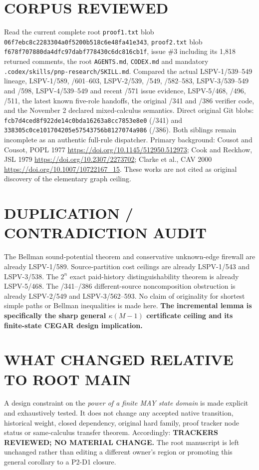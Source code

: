 \documentclass[11pt]{article}
\begin{document}
\section*{CORPUS REVIEWED}
Read the current complete root \texttt{proof1.txt} blob
\texttt{06f7ebc8c2283304a0f5200b518c6e48fa41e343},
\texttt{proof2.txt} blob \texttt{f678f707880da4dfc97dabf778430c6dc816cb1f},
issue \#3 including its 1,818 returned comments, the root \texttt{AGENTS.md},
\texttt{CODEX.md} and mandatory \texttt{.codex/skills/pnp-research/SKILL.md}.
Compared the actual LSPV-1/539--549 lineage, LSPV-1/589, /601--603,
LSPV-2/539, /549, /582--583, LSPV-3/539--549 and /598,
LSPV-4/539--549 and recent /571 issue evidence,
LSPV-5/468, /496, /511, the latest known five-role handoffs,
the original /341 and /386 verifier code, and the November 2 declared
mixed-calculus semantics. Direct original Git blobs:
\texttt{fcb7d4ced8f922de14c0bda16263a8cc7853e8e0} (/341) and
\texttt{338305c0ce101704205e57543756b8127074a986} (/386).
Both siblings remain incomplete as an authentic full-rule dispatcher.
Primary background: Cousot and Cousot, POPL 1977
\url{https://doi.org/10.1145/512950.512973};
Cook and Reckhow, JSL 1979
\url{https://doi.org/10.2307/2273702};
Clarke et al., CAV 2000
\url{https://doi.org/10.1007/10722167_15}.
These works are not cited as original discovery of the elementary graph ceiling.

\section*{DUPLICATION / CONTRADICTION AUDIT}
The Bellman sound-potential theorem and conservative unknown-edge firewall
are already LSPV-1/589. Source-partition cost ceilings are already
LSPV-1/543 and LSPV-3/538. The $2^n$ exact paid-history distinguishability
theorem is already LSPV-5/468. The /341--/386 different-source noncomposition
obstruction is already LSPV-2/549 and LSPV-3/562--593. No claim of originality
for shortest simple paths or Bellman inequalities is made here.
\textbf{The incremental lemma is specifically the sharp general
$\kappa(M-1)$ certificate ceiling and its finite-state CEGAR design implication.}

\section*{WHAT CHANGED RELATIVE TO ROOT MAIN}
A design constraint on the \emph{power of a finite MAY state domain} is made explicit
and exhaustively tested. It does not change any accepted native transition, historical
weight, closed dependency, original hard family, proof tracker node status or
same-calculus transfer theorem. Accordingly:
\textbf{TRACKERS REVIEWED; NO MATERIAL CHANGE.}
The root manuscript is left unchanged rather than editing a different
owner's region or promoting this general corollary to a P2-D1 closure.
\end{document}
